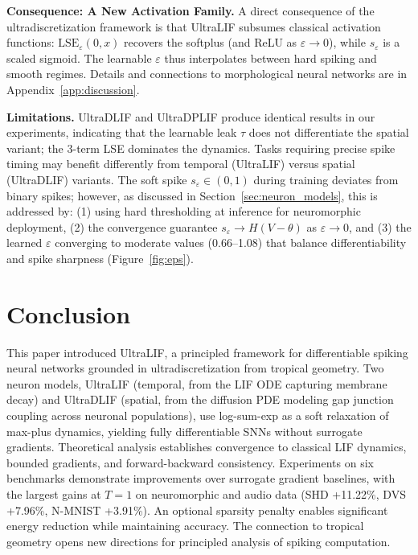 \documentclass{article}
\theoremstyle{plain}
\theoremstyle{definition}
\theoremstyle{remark}
\newcommand{\lse}{\mathrm{LSE}}
\newcommand{\eps}{\varepsilon}
\begin{document}
\textbf{Consequence: A New Activation Family.} A direct consequence of the ultradiscretization framework is that UltraLIF subsumes classical activation functions: $\lse_\eps(0, x)$ recovers the softplus (and ReLU as $\eps \to 0$), while $s_\eps$ is a scaled sigmoid. The learnable $\eps$ thus interpolates between hard spiking and smooth regimes. Details and connections to morphological neural networks are in Appendix~\ref{app:discussion}.

\textbf{Limitations.} UltraDLIF and UltraDPLIF produce identical results in our experiments, indicating that the learnable leak $\tau$ does not differentiate the spatial variant; the 3-term LSE dominates the dynamics. Tasks requiring precise spike timing may benefit differently from temporal (UltraLIF) versus spatial (UltraDLIF) variants. The soft spike $s_\eps \in (0,1)$ during training deviates from binary spikes; however, as discussed in Section~\ref{sec:neuron_models}, this is addressed by: (1) using hard thresholding at inference for neuromorphic deployment, (2) the convergence guarantee $s_\eps \to H(V-\theta)$ as $\eps \to 0$, and (3) the learned $\eps$ converging to moderate values (0.66--1.08) that balance differentiability and spike sharpness (Figure~\ref{fig:eps}).

\section{Conclusion}
\label{sec:conclusion}

This paper introduced UltraLIF, a principled framework for differentiable spiking neural networks grounded in ultradiscretization from tropical geometry. Two neuron models, UltraLIF (temporal, from the LIF ODE capturing membrane decay) and UltraDLIF (spatial, from the diffusion PDE modeling gap junction coupling across neuronal populations), use log-sum-exp as a soft relaxation of max-plus dynamics, yielding fully differentiable SNNs without surrogate gradients. Theoretical analysis establishes convergence to classical LIF dynamics, bounded gradients, and forward-backward consistency. Experiments on six benchmarks demonstrate improvements over surrogate gradient baselines, with the largest gains at $T{=}1$ on neuromorphic and audio data (SHD +11.22\%, DVS +7.96\%, N-MNIST +3.91\%). An optional sparsity penalty enables significant energy reduction while maintaining accuracy. The connection to tropical geometry opens new directions for principled analysis of spiking computation.
\end{document}
